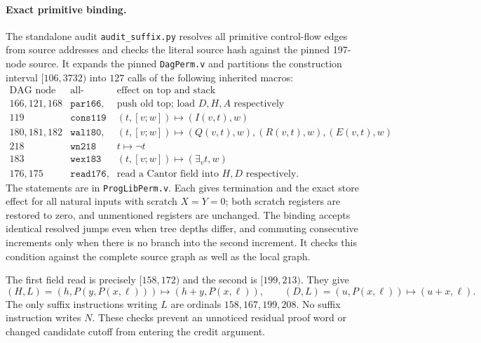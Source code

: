 \paragraph{Exact primitive binding.}
The standalone audit \texttt{audit\_suffix.py} resolves all primitive
control-flow edges from source addresses and checks the literal source
hash against the pinned 197-node source.  It expands the pinned
\texttt{DagPerm.v} and partitions the construction interval
$[106,3732)$ into $127$ calls of the following inherited macros:
\[
 \begin{array}{c|l|l}
 \text{DAG node}&\text{all-natural lemma}&\text{effect on top and stack}\\\hline
 166,121,168&\texttt{par166, par121, par168}&
         \text{push old top; load }D,H,A\text{ respectively}\\
 119&\texttt{cons119}&(t,[v;w])\mapsto(I(v,t),w)\\
 180,181,182&\texttt{wal180, wel181, weq182}&
         (t,[v;w])\mapsto(Q(v,t),w),(R(v,t),w),(E(v,t),w)\\
 218&\texttt{wn218}&t\mapsto\neg t\\
 183&\texttt{wex183}&(t,[v;w])\mapsto(\exists_v t,w)\\
 176,175&\texttt{read176, read175}&
         \text{read a Cantor field into }H,D\text{ respectively}.
 \end{array}
\]
The statements are in \texttt{ProgLibPerm.v}.  Each gives termination
and the exact store effect for all natural inputs with scratch $X=Y=0$;
both scratch registers are restored to zero, and unmentioned registers
are unchanged.  The binding accepts identical resolved jumps even when
tree depths differ, and commuting consecutive increments only when
there is no branch into the second increment.  It checks this condition
against the complete source graph as well as the local graph.

The first field read is precisely $[158,172)$ and the second is
$[199,213)$.  They give
\[
 (H,L)=(h,P(y,P(x,\ell)))\mapsto(h+y,P(x,\ell)),\qquad
 (D,L)=(u,P(x,\ell))\mapsto(u+x,\ell).
\]
The only suffix instructions writing $L$ are ordinals
$158,167,199,208$.  No suffix instruction writes $N$.
These checks prevent an unnoticed residual proof word or changed
candidate cutoff from entering the credit argument.

